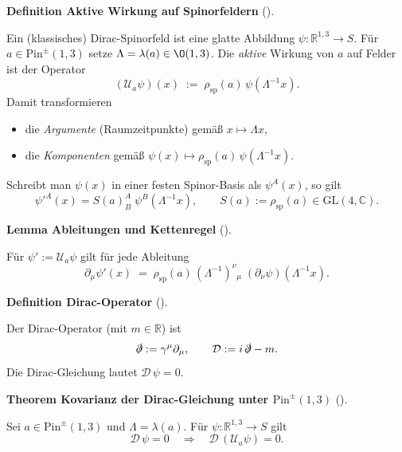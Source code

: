 \documentclass[10pt, letterpaper]{article}
\newcommand{\R}{\mathbb{R}}
\newcommand{\C}{\mathbb{C}}
\newcommand{\GL}{\mathrm{GL}}
\newcommand{\Pin}{\mathrm{Pin}}
\newcommand{\CustomHeading}[3]{%
  \par\medskip\noindent%
  \textbf{#1 #2} \textnormal{(#3)}.\enskip%
}
\newenvironment{DEF}[2]{\begin{unitbox}\CustomHeading{Definition}{#1}{#2}}{\end{unitbox}}
\newenvironment{THEO}[2]{\begin{unitbox}\CustomHeading{Theorem}{#1}{#2}}{\end{unitbox}}
\newenvironment{LEM}[2]{\begin{unitbox}\CustomHeading{Lemma}{#1}{#2}}{\end{unitbox}}
\begin{document}
\begin{DEF}{Aktive Wirkung auf Spinorfeldern}{}
Ein (klassisches) Dirac-Spinorfeld ist eine glatte Abbildung $\psi:\R^{1,3}\to S$.
Für $a\in \Pin^{\pm}(1,3)$ setze $\Lambda=\lambda(a)\in \O(1,3)$.
Die \emph{aktive} Wirkung von $a$ auf Felder ist der Operator
\[
(\mathcal U_a\psi)(x)\;:=\;\rho_{\mathrm{sp}}(a)\,\psi(\Lambda^{-1}x).
\]
Damit transformieren
\begin{itemize}
\item die \emph{Argumente} (Raumzeitpunkte) gemäß $x\mapsto \Lambda x$,
\item die \emph{Komponenten} gemäß $\psi(x)\mapsto \rho_{\mathrm{sp}}(a)\,\psi(\Lambda^{-1}x)$.
\end{itemize}
Schreibt man $\psi(x)$ in einer festen Spinor-Basis als $\psi^A(x)$, so gilt
\[
\psi'^A(x)=S(a)^A_{B}\;\psi^B(\Lambda^{-1}x),
\qquad S(a):=\rho_{\mathrm{sp}}(a)\in \GL(4,\C).
\]
\end{DEF}

\begin{LEM}{Ableitungen und Kettenregel}{}
Für $\psi':=\mathcal U_a\psi$ gilt für jede Ableitung
\[
\partial_\mu \psi'(x)\;=\;
\rho_{\mathrm{sp}}(a)\,(\Lambda^{-1})^\nu{}_\mu\;(\partial_\nu \psi)(\Lambda^{-1}x).
\]
\end{LEM}

\begin{DEF}{Dirac-Operator}{}
Der Dirac-Operator (mit $m\in\R$) ist
\[
\slashed{\partial}:=\gamma^\mu\partial_\mu,\qquad
\mathcal D:= i\,\slashed{\partial}-m.
\]
Die Dirac-Gleichung lautet $\mathcal D\,\psi=0$.
\end{DEF}

\begin{THEO}{Kovarianz der Dirac-Gleichung unter $\Pin^{\pm}(1,3)$}{}
Sei $a\in \Pin^{\pm}(1,3)$ und $\Lambda=\lambda(a)$. Für $\psi:\R^{1,3}\to S$ gilt
\[
\mathcal D\,\psi=0\quad\Longrightarrow\quad \mathcal D\,(\mathcal U_a\psi)=0.
\]
\end{THEO}
\end{document}
